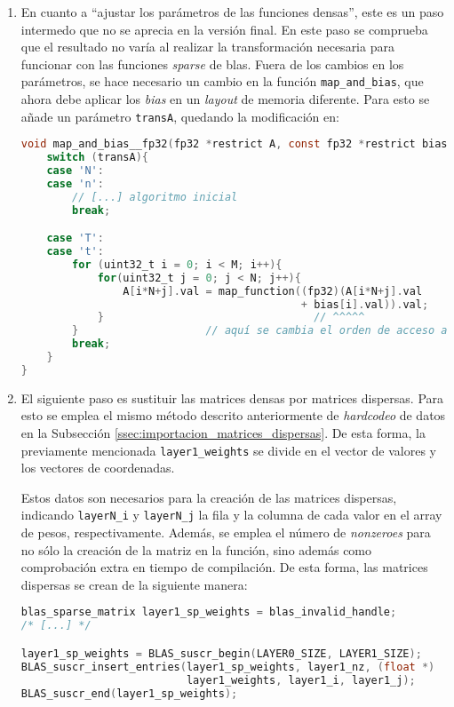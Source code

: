 \begin{enumerate}
    \item En cuanto a ``ajustar los parámetros de las funciones densas'', este es un paso intermedo que no se aprecia en la versión final. En este paso se comprueba que el resultado no varía al realizar la transformación necesaria para funcionar con las funciones \textit{sparse} de \acrshort{blas}. Fuera de los cambios en los parámetros, se hace necesario un cambio en la función \texttt{map\_and\_bias}, que ahora debe aplicar los \textit{bias} en un \textit{layout} de memoria diferente. Para esto se añade un parámetro \texttt{transA}, quedando la modificación en:\medskip
\begin{lstlisting}[language=C]
void map_and_bias__fp32(fp32 *restrict A, const fp32 *restrict bias, const uint32_t M, const uint32_t N, const char transA, fp32 (* map_function)(fp32 x)){
    switch (transA){
    case 'N':
    case 'n':
        // [...] algoritmo inicial
        break;

    case 'T':
    case 't':
        for (uint32_t i = 0; i < M; i++){
            for(uint32_t j = 0; j < N; j++){
                A[i*N+j].val = map_function((fp32)(A[i*N+j].val 
                                            + bias[i].val)).val;
            }                                 // ^^^^^
        }                    // aquí se cambia el orden de acceso a bias
        break;
    }
}
\end{lstlisting}

    \item El siguiente paso es sustituir las matrices densas por matrices dispersas. Para esto se emplea el mismo método descrito anteriormente de \textit{hardcodeo} de datos en la Subsección \ref{ssec:importacion_matrices_dispersas}. De esta forma, la previamente mencionada \texttt{layer1\_weights} se divide en el vector de valores y los vectores de coordenadas.
    
    Estos datos son necesarios para la creación de las matrices dispersas, indicando \texttt{layerN\_i} y \texttt{layerN\_j} la fila y la columna de cada valor en el array de pesos, respectivamente. Además, se emplea el número de \textit{nonzeroes} para no sólo la creación de la matriz en la función, sino además como comprobación extra en tiempo de compilación. De esta forma, las matrices dispersas se crean de la siguiente manera:
\begin{lstlisting}[language=C]
blas_sparse_matrix layer1_sp_weights = blas_invalid_handle;
/* [...] */

layer1_sp_weights = BLAS_suscr_begin(LAYER0_SIZE, LAYER1_SIZE);
BLAS_suscr_insert_entries(layer1_sp_weights, layer1_nz, (float *)
                          layer1_weights, layer1_i, layer1_j);
BLAS_suscr_end(layer1_sp_weights);
\end{lstlisting}


\end{enumerate}
